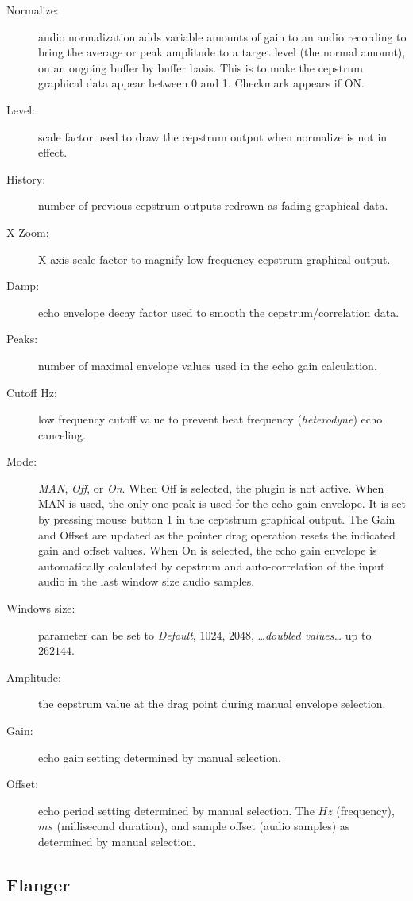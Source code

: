 \begin{description}
    \item[Normalize:] audio normalization adds variable amounts of gain to an audio recording to bring the average or peak amplitude to a target level (the normal amount), on an ongoing buffer by buffer basis. This is to make the cepstrum graphical data appear between 0 and 1. Checkmark appears if ON.
    \item[Level:] scale factor used to draw the cepstrum output when normalize is not in effect.
    \item[History:] number of previous cepstrum outputs redrawn as fading graphical data.
    \item[X Zoom:] X axis scale factor to magnify low frequency cepstrum graphical output.
    \item[Damp:] echo envelope decay factor used to smooth the cepstrum/correlation data.
    \item[Peaks:] number of maximal envelope values used in the echo gain calculation.
    \item[Cutoff Hz:] low frequency cutoff value to prevent beat frequency (\textit{heterodyne}) echo canceling.
    \item[Mode:] \textit{MAN}, \textit{Off}, or \textit{On}. When Off is selected, the plugin is not active. When MAN is used, the only one peak is used for the echo gain envelope. It is set by pressing mouse button $1$ in the ceptstrum graphical output. The Gain and Offset are updated as the pointer drag operation resets the indicated gain and offset values. When On is selected, the echo gain envelope is automatically calculated by cepstrum and auto-correlation of the input audio in the last window size audio samples.
    \item[Windows size:] parameter can be set to \textit{Default}, $1024$, $2048$, \dots \textit{doubled values\dots} up to $262144$.
    \item[Amplitude:] the cepstrum value at the drag point during manual envelope selection.
    \item[Gain:] echo gain setting determined by manual selection.
    \item[Offset:] echo period setting determined by manual selection. The $Hz$ (frequency), $ms$ (millisecond duration), and sample offset (audio samples) as determined by manual selection.
\end{description}

\subsection{Flanger}%
\label{sub:flanger}

